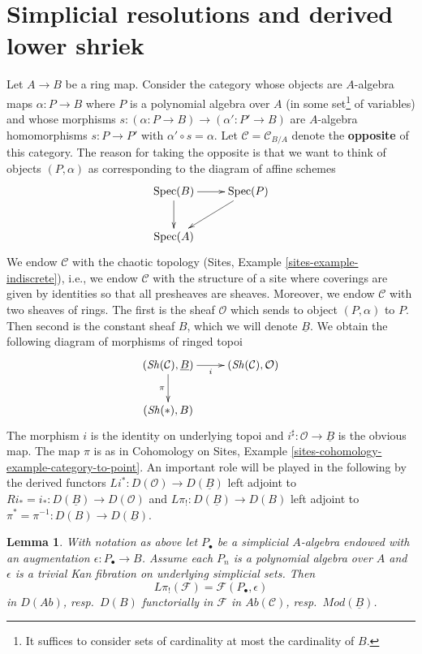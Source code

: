 \documentclass[10pt,a4paper]{amsart}
\theoremstyle{plain}
\newtheorem{lemma}[subsection]{Lemma}
\theoremstyle{definition}
\theoremstyle{remark}
\numberwithin{equation}{subsection}
\def\Spec{\mathop{\mathrm{Spec}}}
\def\Sh{\mathop{\mathit{Sh}}\nolimits}
\begin{document}
\section{Simplicial resolutions and derived lower shriek}
\label{section-compute-L-pi-shriek}

\noindent
Let $A \to B$ be a ring map. Consider the category whose objects are
$A$-algebra maps $\alpha : P \to B$ where $P$ is a polynomial algebra over $A$
(in some set\footnote{It suffices to consider sets of cardinality
at most the cardinality of $B$.} of variables) and whose
morphisms $s : (\alpha : P \to B) \to (\alpha' : P' \to B)$ are
$A$-algebra homomorphisms $s : P \to P'$ with $\alpha' \circ s = \alpha$.
Let $\mathcal{C} = \mathcal{C}_{B/A}$ denote the {\bf opposite}
of this category. The reason for
taking the opposite is that we want to think of objects
$(P, \alpha)$ as corresponding to the diagram of affine schemes
$$
\xymatrix{
\Spec(B) \ar[d] \ar[r] & \Spec(P) \ar[ld] \\
\Spec(A)
}
$$
We endow $\mathcal{C}$ with the chaotic topology
(Sites, Example \ref{sites-example-indiscrete}), i.e., we endow
$\mathcal{C}$ with the structure of a site where coverings are given by
identities so that all presheaves are sheaves.
Moreover, we endow $\mathcal{C}$ with two sheaves of rings. The first
is the sheaf $\mathcal{O}$ which sends to object $(P, \alpha)$ to $P$.
Then second is the constant sheaf $B$, which we will denote
$\underline{B}$. We obtain the following diagram of morphisms of
ringed topoi
\begin{equation}
\label{equation-pi}
\vcenter{
\xymatrix{
(\Sh(\mathcal{C}), \underline{B}) \ar[r]_i \ar[d]_\pi &
(\Sh(\mathcal{C}), \mathcal{O}) \\
(\Sh(*), B)
}
}
\end{equation}
The morphism $i$ is the identity on underlying topoi and
$i^\sharp : \mathcal{O} \to \underline{B}$ is the obvious map.
The map $\pi$ is as in Cohomology on Sites, Example
\ref{sites-cohomology-example-category-to-point}.
An important role will be played in the following
by the derived functors
$
Li^* : D(\mathcal{O}) \longrightarrow D(\underline{B})
$
left adjoint to $Ri_* = i_* : D(\underline{B}) \to D(\mathcal{O})$ and
$
L\pi_! : D(\underline{B}) \longrightarrow D(B)
$
left adjoint to $\pi^* = \pi^{-1} : D(B) \to D(\underline{B})$.

\begin{lemma}
\label{lemma-identify-pi-shriek}
With notation as above let $P_\bullet$ be a simplicial $A$-algebra
endowed with an augmentation $\epsilon : P_\bullet \to B$.
Assume each $P_n$ is a polynomial algebra over $A$ and $\epsilon$
is a trivial Kan fibration on underlying simplicial sets. Then
$$
L\pi_!(\mathcal{F}) = \mathcal{F}(P_\bullet, \epsilon)
$$
in $D(\textit{Ab})$, resp.\ $D(B)$ functorially in $\mathcal{F}$ in
$\textit{Ab}(\mathcal{C})$, resp.\ $\textit{Mod}(\underline{B})$.
\end{lemma}
\end{document}
